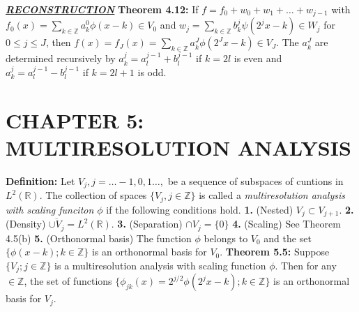 \documentclass[a4paper]{article}
\newcommand{\R}{\mathbb{R}}
\newcommand{\Z}{\mathbb{Z}}
\begin{document}
\begin{multicols}{2}
\underline{\textsl{\bf RECONSTRUCTION}}
{\bf Theorem 4.12:} If $f=f_0+w_0+w_1+\dots +w_{j-1}$ with $f_{0}(x)=\sum_{k\in\Z}a_k^0\phi(x-k)\in V_0$ and $w_{j}=\sum_{k\in\Z}b_k^{j}\psi(2^jx-k)\in W_{j}$ for $0\leq j\leq J$, then $f(x)=f_J(x)=\sum_{k\in\Z}a_k^J\phi(2^Jx-k)\in V_J$. The $a_k^J$ are determined recursively by $a_k^j = a_l^{j-1}+b_l^{j-1}$ if $k=2l$ is even and $a_k^j = a_l^{j-1}-b_l^{j-1}$ if $k=2l+1$ is odd.

\section*{CHAPTER 5: MULTIRESOLUTION ANALYSIS}
{\bf Definition:} Let $V_j, j=\dots -1,0,1\dots,$ be a sequence of subspaces of cuntions in $L^2(\R)$. The collection of spaces $\{V_j,j\in\Z\}$ is called a \textit{multiresolution analysis with scaling funciton $\phi$} if the following conditions hold. {\bf 1.} (Nested) $V_j\subset V_{j+1}$. {\bf 2.} (Density) $\overline{\cup V_j}=L^2(\R)$. {\bf 3.} (Separation) $\cap V_j=\{0\}$ {\bf 4.} (Scaling) See Theorem 4.5(b) {\bf 5.} (Orthonormal basis) The function $\phi$ belongs to $V_0$ and the set $\{\phi(x-k);k\in\Z\}$ is an orthonormal basis for $V_0$.
{\bf Theorem 5.5:} Suppose $\{V_j; j\in\Z\}$ is a multiresolution analysis with scaling function $\phi$. Then for any $\in\Z$, the set of functions $\{\phi_{jk}(x)=2^{j/2}\phi(2^jx-k);k\in\Z\}$ is an orthonormal basis for $V_j$. 


\end{multicols}
\end{document}
